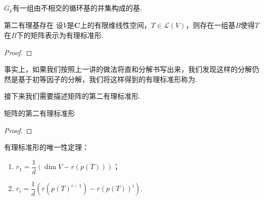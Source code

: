 \begin{corollary}{}{}
    $G_p$有一组由不相交的循环基的并集构成的基.
\end{corollary}

\begin{corollary}{}{第二有理基存在}
    设$V$是$\mathbf{C}$上的有限维线性空间，$T\in\mathcal{L}(V)$，则存在一组基$B$使得$T$在$B$下的矩阵表示为有理标准形.
\end{corollary}
\begin{proof}

\end{proof}
事实上，如果我们按照上一讲的做法将直和分解书写出来，我们发现这样的分解仍然是基于初等因子的分解，我们将这样得到的有理标准形称为.

接下来我们需要描述矩阵的第二有理标准形.
\begin{corollary}{}{}
    矩阵的第二有理标准形
\end{corollary}
\begin{proof}

\end{proof}

有理标准形的唯一性定理：
\begin{theorem}{}{}
    \begin{enumerate}
        \item $r_1=\dfrac{1}{d}(\dim V-r(p(T)))$；
        \item $r_i=\dfrac{1}{d}(r(p(T)^{i-1})-r(p(T))^i)$.
    \end{enumerate}
\end{theorem}

